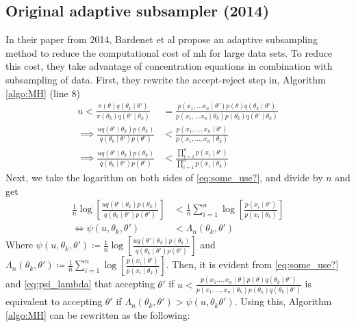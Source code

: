 \documentclass{article}
\theoremstyle{definition}
\begin{document}
\subsection{Original adaptive subsampler (2014)}
In their paper from 2014, Bardenet et al \cite{Bardenet:2} propose an adaptive subsampling method to reduce the computational cost of \gls{mh} for large data sets.  To reduce this cost, they take advantage of concentration equations in combination with subsampling of data. First, they rewrite the accept-reject step in, Algorithm \ref{algo:MH}  (line 8)  
\begin{equation}\label{eq:some_use?}
\begin{split}
    u < \frac{\pi\left(\theta\right)q\left(\theta_k\mid \theta'\right)}{\pi \left(\theta_k\right)q\left(\theta'\mid \theta_k\right)} &= \frac{p\left(x_1, \ldots x_n \mid \theta'\right) p\left(\theta\right)q\left(\theta_k\mid \theta'\right)}{p\left(x_1, \ldots x_n\mid \theta_k\right)p\left(\theta_k\right)q\left(\theta'\mid\theta_k\right)} \\
    \implies \frac{u q\left(\theta'\mid \theta_k \right)p\left(\theta_k\right)}{q\left(\theta_k\mid\theta'\right)p\left(\theta'\right)} &< \frac{p\left(x_1, \ldots, x_n \mid \theta'\right)}{p\left(x_1, \ldots, x_n \mid \theta_k\right)} \\
    \implies \frac{u q\left(\theta'\mid \theta_k \right) p\left(\theta_k\right)}{q\left(\theta_k \mid \theta'\right) p \left(\theta'\right)} &< \frac{\prod_{i = 1}^n p\left(x_i\mid \theta'\right)}{\prod_{i = 1}^n p\left(x_i \mid \theta_k\right)}
\end{split}
\end{equation}
Next, we take the logarithm on both sides of \ref{eq:some_use?}, and divide by $n$ and get
\begin{equation}\label{eq:psi_lambda}
\begin{split}
     \frac{1}{n} \log \left[\frac{u q\left(\theta' \mid \theta_k\right)p\left(\theta_k\right)}{q\left(\theta_k\mid \theta'\right)p\left(\theta'\right)}\right] &< \frac{1}{n} \sum_{i = 1}^n \log \left[\frac{p\left(x_i\mid \theta'\right)}{p\left(x_i \mid \theta_k\right)}\right] \\
     \iff  \psi\left(u, \theta_k, \theta'\right) &< \Lambda_n\left(\theta_k,\theta'\right) 
\end{split}
\end{equation}
Where $\psi\left(u, \theta_k, \theta'\right)\coloneqq \frac{1}{n}\log\left[\frac{u q\left(\theta'\mid\theta_k\right)p\left(\theta_k\right)}{q\left(\theta_k\mid \theta'\right)p\left(\theta'\right)}\right]$ and $\Lambda_n\left(\theta_k, \theta'\right) \coloneqq \frac{1}{n}\sum_{i = 1}^n \log\left[\frac{p\left(x_i\mid \theta'\right)}{p\left(x_i\mid\theta_k\right)}\right]$. Then, it is evident from \eqref{eq:some_use?} and \eqref{eq:psi_lambda} that accepting $\theta'$ if $u < \frac{p\left(x_1\ldots, x_n\mid \theta\right)p\left(\theta\right)q\left(\theta_k\mid \theta'\right)}{p\left(x_1, \ldots, x_n\mid \theta_k\right)p\left(\theta_k\right)q\left(\theta_k\mid\theta'\right)}$ is equivalent to accepting $\theta'$ if $\Lambda_n\left(\theta_k, \theta'\right)>\psi\left(u,\theta_k\theta'\right)$. Using this, Algorithm \ref{algo:MH} can be rewritten as the following:
\end{document}
